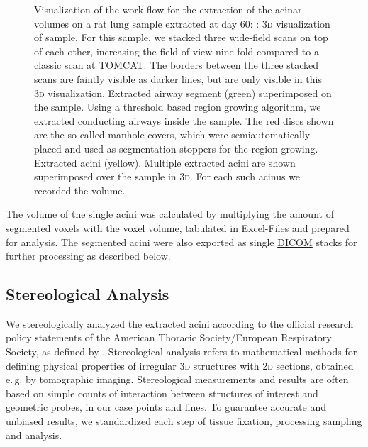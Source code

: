 \documentclass[%
	paper=a4,%
	abstract=true,%
	]{scrartcl}
\newlength\imagescale		%
\newcommand{\eg}{e.\,g.\xspace}
\newcommand{\twod}{2\textsc{d}\xspace}
\newcommand{\threed}{3\textsc{d}\xspace}
\begin{document}
\begin{figure}
{%
		\label{subfig:extracted acini}%
		}
	\caption{Visualization of the work flow for the extraction of the acinar volumes on a rat lung sample extracted at day 60: %
		: \threed visualization of sample. For this sample, we stacked three wide-field scans on top of each other, increasing the field of view nine-fold compared to a classic scan at TOMCAT. The borders between the three stacked scans are faintly visible as darker lines, but are only visible in this \threed visualization. %
		 Extracted airway segment (green) superimposed on the sample. Using a threshold based region growing algorithm, we extracted conducting airways inside the sample. The red discs shown are the so-called manhole covers, which were semiautomatically placed and used as segmentation stoppers for the region growing. %
		 Extracted acini (yellow). Multiple extracted acini are shown superimposed over the sample in \threed. For each such acinus we recorded the volume.%
		}
	\label{fig:workflow}
\end{figure}

The volume of the single acini was calculated by multiplying the amount of segmented voxels with the voxel volume, tabulated in Excel-Files and prepared for analysis. The segmented acini were also exported as single \href{https://secure.wikimedia.org/wikipedia/en/w/index.php?title=Digital_Imaging_and_Communications_in_Medicine&oldid=415023605}{DICOM} stacks for further processing as described below.

\subsection{Stereological Analysis}
We stereologically analyzed the extracted acini according to the official research policy statements of the American Thoracic Society/European Respiratory Society, as defined by \citet{Hsia2010}. Stereological analysis refers to mathematical methods for defining physical properties of irregular \threed structures with \twod sections, obtained \eg by tomographic imaging. Stereological measurements and results are often based on simple counts of interaction between structures of interest and geometric probes, in our case points and lines. To guarantee accurate and unbiased results, we standardized each step of tissue fixation, processing sampling and analysis.
\end{document}

